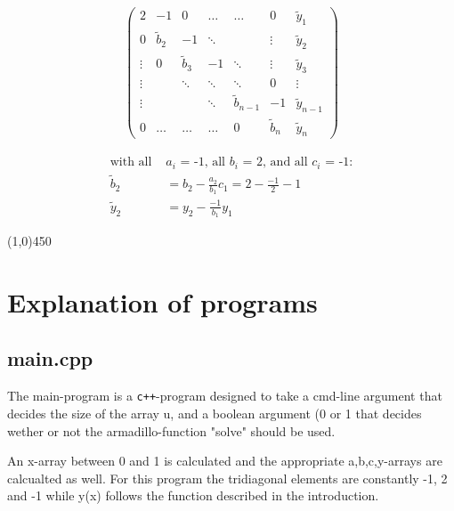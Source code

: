 \documentclass[11pt,a4paper,notitlepage]{article}
\begin{document}
\begin{minipage}{0.5\linewidth}
\begin{align*}
\left(\begin{matrix}
  2     & -1          & 0           & \dots   & \dots          & 0           &\tilde{y}_1    \\
  0     & \tilde{b}_2 & -1          & \ddots  &                & \vdots      &\tilde{y}_2    \\
 \vdots & 0           & \tilde{b}_3 & -1      & \ddots         & \vdots      &\tilde{y}_3    \\
 \vdots &             & \ddots      & \ddots  & \ddots         & 0           &\vdots         \\
 \vdots &             &             & \ddots  & \tilde{b}_{n-1}& -1       &\tilde{y}_{n-1}\\
  0     & \dots       & \dots       & \dots   & 0              & \tilde{b}_n &\tilde{y}_n
\end{matrix}\right)
\end{align*}
\end{minipage}
\begin{minipage}{0.5\linewidth}
	\begin{align*}
	\text{with all } &\text{$a_i$ = -1, all $b_i$ = 2, and all $c_i$ = -1:}\\
	\tilde{b}_2 &= b_2 - \frac{a_2}{b_1} c_1  = 2 - \frac{-1}{2} -1\\
	\tilde{y}_2 &= y_2 - \frac{-1}{b_1} y_1
	\end{align*}
\end{minipage}

\begin{center}
\line(1,0){450}
\end{center}

\section{Explanation of programs}
\subsection{main.cpp}
	The main-program is a \verb|c++|-program designed to take a cmd-line argument that decides the size of the array u, and a boolean argument (0 or 1 that decides wether or not the armadillo-function "solve" should be used.
	
	An x-array between 0 and 1 is calculated and the appropriate a,b,c,y-arrays are calcualted as well. For this program the tridiagonal elements are constantly -1, 2 and -1 while y(x) follows the function described in the introduction. \\
	
\end{document}
